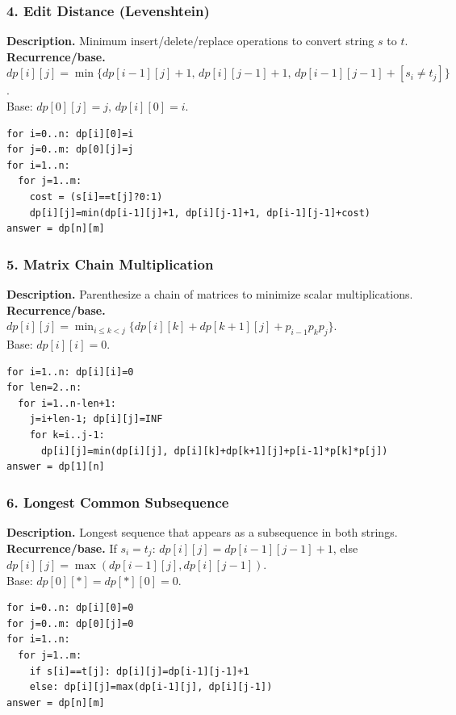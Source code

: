 \documentclass[9pt]{extarticle}
\begin{document}
\subsubsection{4. Edit Distance (Levenshtein)}
\textbf{Description.} Minimum insert/delete/replace operations to convert string \(s\) to \(t\).\\
\textbf{Recurrence/base.} \(dp[i][j]=\min\{dp[i-1][j]+1,\,dp[i][j-1]+1,\,dp[i-1][j-1]+\![s_i\ne t_j]\}\).  \\
Base: \(dp[0][j]=j,\,dp[i][0]=i\).
\begin{verbatim}
for i=0..n: dp[i][0]=i
for j=0..m: dp[0][j]=j
for i=1..n:
  for j=1..m:
    cost = (s[i]==t[j]?0:1)
    dp[i][j]=min(dp[i-1][j]+1, dp[i][j-1]+1, dp[i-1][j-1]+cost)
answer = dp[n][m]
\end{verbatim}

\subsubsection{5. Matrix Chain Multiplication}
\textbf{Description.} Parenthesize a chain of matrices to minimize scalar multiplications.\\
\textbf{Recurrence/base.} \(dp[i][j]=\min_{i\le k<j}\{dp[i][k]+dp[k+1][j]+p_{i-1}p_kp_j\}\).\\  
Base: \(dp[i][i]=0\).
\begin{verbatim}
for i=1..n: dp[i][i]=0
for len=2..n:
  for i=1..n-len+1:
    j=i+len-1; dp[i][j]=INF
    for k=i..j-1:
      dp[i][j]=min(dp[i][j], dp[i][k]+dp[k+1][j]+p[i-1]*p[k]*p[j])
answer = dp[1][n]
\end{verbatim}

\subsubsection{6. Longest Common Subsequence}
\textbf{Description.} Longest sequence that appears as a subsequence in both strings.\\
\textbf{Recurrence/base.} If \(s_i=t_j\): \(dp[i][j]=dp[i-1][j-1]+1\), else \(dp[i][j]=\max(dp[i-1][j],dp[i][j-1])\).  \\
Base: \(dp[0][*]=dp[*][0]=0\).
\begin{verbatim}
for i=0..n: dp[i][0]=0
for j=0..m: dp[0][j]=0
for i=1..n:
  for j=1..m:
    if s[i]==t[j]: dp[i][j]=dp[i-1][j-1]+1
    else: dp[i][j]=max(dp[i-1][j], dp[i][j-1])
answer = dp[n][m]
\end{verbatim}
\end{document}

